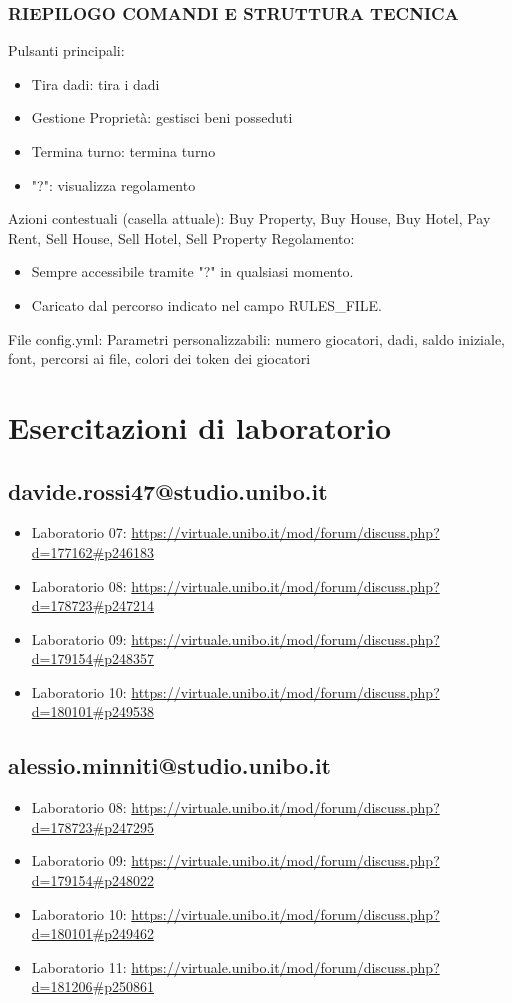\subsection{RIEPILOGO COMANDI E STRUTTURA TECNICA}
Pulsanti principali:
\begin{itemize}
    \item Tira dadi: tira i dadi
    \item Gestione Proprietà: gestisci beni posseduti
    \item Termina turno: termina turno
    \item "?": visualizza regolamento
\end{itemize}
Azioni contestuali (casella attuale):\newline
Buy Property, Buy House, Buy Hotel, Pay Rent, Sell House, Sell Hotel, Sell Property\newline
Regolamento:\newline
\begin{itemize}
    \item Sempre accessibile tramite "?" in qualsiasi momento.
    \item Caricato dal percorso indicato nel campo RULES\_FILE.
\end{itemize}
File config.yml:\newline
Parametri personalizzabili: numero giocatori, dadi, saldo iniziale, font, percorsi ai file, colori dei token dei giocatori
\chapter{Esercitazioni di laboratorio}
\section{davide.rossi47@studio.unibo.it}
\begin{itemize}
    \item Laboratorio 07: \url{https://virtuale.unibo.it/mod/forum/discuss.php?d=177162#p246183}
    \item Laboratorio 08: \url{https://virtuale.unibo.it/mod/forum/discuss.php?d=178723#p247214}
    \item Laboratorio 09: \url{https://virtuale.unibo.it/mod/forum/discuss.php?d=179154#p248357}
    \item Laboratorio 10: \url{https://virtuale.unibo.it/mod/forum/discuss.php?d=180101#p249538}
\end{itemize}
\section{alessio.minniti@studio.unibo.it}
\begin{itemize}
    \item Laboratorio 08: \url{https://virtuale.unibo.it/mod/forum/discuss.php?d=178723#p247295}
    \item Laboratorio 09: \url{https://virtuale.unibo.it/mod/forum/discuss.php?d=179154#p248022}
    \item Laboratorio 10: \url{https://virtuale.unibo.it/mod/forum/discuss.php?d=180101#p249462}
    \item Laboratorio 11: \url{https://virtuale.unibo.it/mod/forum/discuss.php?d=181206#p250861}
\end{itemize}